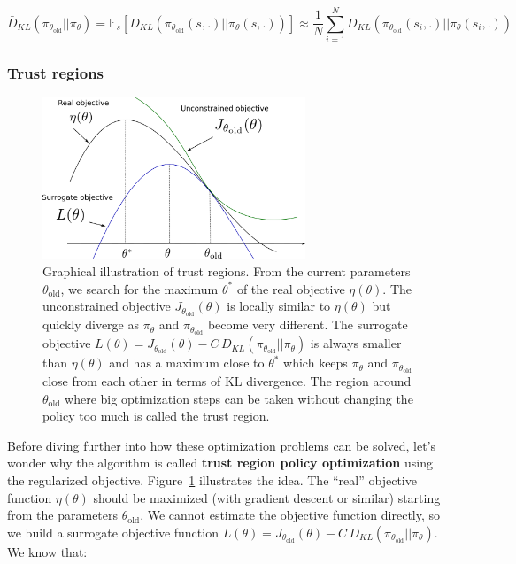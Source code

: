 \documentclass[
  letterpaper,
  DIV=11,
  numbers=noendperiod]{scrreprt}
\begin{document}
\[
    \bar{D}_{KL}(\pi_{\theta_\text{old}} || \pi_\theta) = \mathbb{E}_s [D_{KL}(\pi_{\theta_\text{old}}(s, .) || \pi_\theta(s, .))] \approx \frac{1}{N} \sum_{i=1}^N D_{KL}(\pi_{\theta_\text{old}}(s_i, .) || \pi_\theta(s_i, .))
\]

\hypertarget{trust-regions}{%
\subsubsection*{Trust regions}\label{trust-regions}}

\begin{figure}

{\centering \includegraphics[width=0.7\textwidth,height=\textheight]{./img/trustregion.png}

}

\caption{\label{fig-trustregion}Graphical illustration of trust regions.
From the current parameters \(\theta_\text{old}\), we search for the
maximum \(\theta^*\) of the real objective \(\eta(\theta)\). The
unconstrained objective \(J_{\theta_\text{old}}(\theta)\) is locally
similar to \(\eta(\theta)\) but quickly diverge as \(\pi_\theta\) and
\(\pi_{\theta_\text{old}}\) become very different. The surrogate
objective
\(L(\theta) = J_{\theta_\text{old}} (\theta) - C \, D_{KL}(\pi_{\theta_\text{old}} || \pi_\theta)\)
is always smaller than \(\eta(\theta)\) and has a maximum close to
\(\theta^*\) which keeps \(\pi_\theta\) and \(\pi_{\theta_\text{old}}\)
close from each other in terms of KL divergence. The region around
\(\theta_\text{old}\) where big optimization steps can be taken without
changing the policy too much is called the trust region.}

\end{figure}

Before diving further into how these optimization problems can be
solved, let's wonder why the algorithm is called \textbf{trust region
policy optimization} using the regularized objective.
Figure~\ref{fig-trustregion} illustrates the idea. The ``real''
objective function \(\eta(\theta)\) should be maximized (with gradient
descent or similar) starting from the parameters \(\theta_\text{old}\).
We cannot estimate the objective function directly, so we build a
surrogate objective function
\(L(\theta) = J_{\theta_\text{old}} (\theta) - C \, D_{KL}(\pi_{\theta_\text{old}} || \pi_\theta)\).
We know that:
\end{document}
